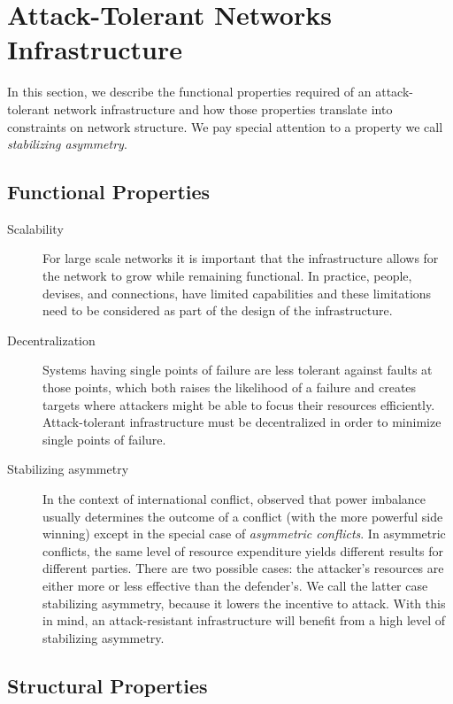 \documentclass[prodmode,permissions]{acmsmall-ec16}
\begin{document}
\section{Attack-Tolerant Networks Infrastructure}

In this section, we describe the functional properties required of an
attack-tolerant network infrastructure and how those properties translate
into constraints on network structure.
We pay special attention to a property we call
{\em stabilizing asymmetry}.

\subsection{Functional Properties}

\begin{description}
\item[Scalability]
For large scale networks it is important that the infrastructure allows for the network to grow while remaining functional. In practice, people, devises, and connections, have limited capabilities and these limitations need to be considered as part of the design of the infrastructure. 

\item [Decentralization]
Systems having single points of failure are less tolerant against faults at those
points, which both raises the likelihood of a failure and creates targets
where attackers might be able to focus their resources efficiently.
Attack-tolerant infrastructure must be decentralized in order to minimize single points of failure.

\item[Stabilizing asymmetry]
In the context of international conflict,
\cite{mack_why_1975}
observed that power imbalance usually determines the outcome of a conflict
(with the more powerful side winning)
except in the special case of {\em asymmetric conflicts}.
In asymmetric conflicts, the same level of resource expenditure yields different
results for different parties.
There are two possible cases:
the attacker's resources are either more or less effective than the defender's.
We call the latter case stabilizing asymmetry,
because it lowers the incentive to attack.
With this in mind, an attack-resistant infrastructure will benefit from a high
level of stabilizing asymmetry.

\end{description}
\subsection{Structural Properties}
\end{document}
